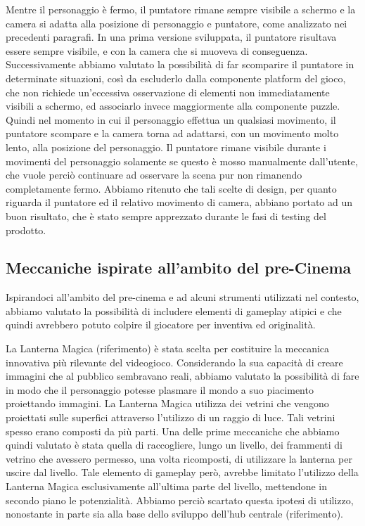Mentre il personaggio è fermo, il puntatore rimane sempre visibile a schermo e la camera si adatta alla posizione di personaggio e puntatore, come analizzato nei precedenti paragrafi. In una prima versione sviluppata, il puntatore risultava essere sempre visibile, e con la camera che si muoveva di conseguenza. Successivamente abbiamo valutato la possibilità di far scomparire il puntatore in determinate situazioni, così da escluderlo dalla componente platform del gioco, che non richiede un'eccessiva osservazione di elementi non immediatamente visibili a schermo, ed associarlo invece maggiormente alla componente puzzle.
Quindi nel momento in cui il personaggio effettua un qualsiasi movimento, il puntatore scompare e la camera torna ad adattarsi, con un movimento molto lento, alla posizione del personaggio.
Il puntatore rimane visibile durante i movimenti del personaggio solamente se questo è mosso manualmente dall’utente, che vuole perciò continuare ad osservare la scena pur non rimanendo completamente fermo.
Abbiamo ritenuto che tali scelte di design, per quanto riguarda il puntatore ed il relativo movimento di camera, abbiano portato ad un buon risultato, che è stato sempre apprezzato durante le fasi di testing del prodotto.

\subsection{Meccaniche ispirate all'ambito del pre-Cinema}
\label{sec:meccaniche_precinema}

Ispirandoci all’ambito del pre-cinema e ad alcuni strumenti utilizzati nel contesto, abbiamo valutato la possibilità di includere elementi di gameplay atipici e che quindi avrebbero potuto colpire il giocatore per inventiva ed originalità.

La Lanterna Magica (riferimento) è stata scelta per costituire la meccanica innovativa più rilevante del videogioco. Considerando la sua capacità di creare immagini che al pubblico sembravano reali, abbiamo valutato la possibilità di fare in modo che il personaggio potesse plasmare il mondo a suo piacimento proiettando immagini.
La Lanterna Magica utilizza dei vetrini che vengono proiettati sulle superfici attraverso l’utilizzo di un raggio di luce. Tali vetrini spesso erano composti da più parti. Una delle prime meccaniche che abbiamo quindi valutato è stata quella di raccogliere, lungo un livello, dei frammenti di vetrino che avessero permesso, una volta ricomposti, di utilizzare la lanterna per uscire dal livello.
Tale elemento di gameplay però, avrebbe limitato l’utilizzo della Lanterna Magica esclusivamente all’ultima parte del livello, mettendone in secondo piano le potenzialità. Abbiamo perciò scartato questa ipotesi di utilizzo, nonostante in parte sia alla base dello sviluppo dell’hub centrale (riferimento).

